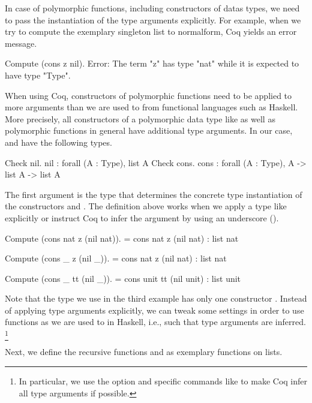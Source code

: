 In case of polymorphic functions, including constructors of datas types, we need to pass the instantiation of the type arguments explicitly.
For example, when we try to compute the exemplary singleton list  to normalform, Coq yields an error message.

\begin{crepl}
\coqrepl Compute (cons z nil).
Error: The term "z" has type "nat" while it is expected to have type
       "Type".
\end{crepl}

When using Coq, constructors of polymorphic functions need to be applied to more arguments than we are used to from functional languages such as Haskell.
More precisely, all constructors of a polymorphic data type like  as well as polymorphic functions in general have additional type arguments.
In our case,  and  have the following types.

\begin{crepl}
\coqrepl Check nil.
   nil : forall (A : Type), list A
\coqrepl Check cons.
   cons : forall (A : Type), A -> list A -> list A
\end{crepl}

The first argument is the type that determines the concrete type instantiation of the constructors  and .
The definition above works when we apply a type like  explicitly or instruct Coq to infer the argument by using an underscore (\cinl{_}).

\begin{crepl}
\coqrepl Compute (cons nat z (nil nat)).
    = cons nat z (nil nat)
    : list nat

\coqrepl Compute (cons _ z (nil _)).
    = cons nat z (nil nat)
    : list nat

\coqrepl Compute (cons _ tt (nil _)).
    = cons unit tt (nil unit)
    : list unit
\end{crepl}

Note that the type  we use in the third example has only one constructor .
Instead of applying type arguments explicitly, we can tweak some settings in order to use functions as we are used to in Haskell, i.e., such that type arguments are inferred. \footnote{In particular, we use the option  and specific commands like  to make Coq infer all type arguments if possible.}

Next, we define the recursive functions  and  as exemplary functions on lists.

